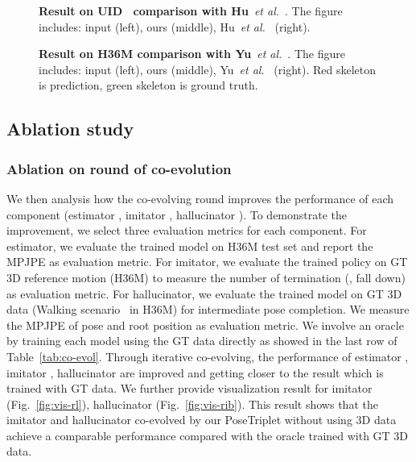 \documentclass[10pt,twocolumn,letterpaper]{article}
\newcommand{\nameofmethod}{PoseTriplet}
\newcommand{\et}{\emph{et al.}}
\begin{document}
\begin{figure}[!t]
\centering
{}
\caption{\textbf{Result on UID~\cite{hu2021unsupervised} comparison with Hu}~\et~\cite{hu2021unsupervised}. The figure includes: input (left), ours (middle), Hu~\et~\cite{hu2021unsupervised} (right).}
\vspace{-1mm}
\label{fig:compare-Hu}
\end{figure}

\begin{figure}[!t]
\centering
{}
\caption{\textbf{Result on H36M comparison with Yu}~\et~\cite{yu2021towards}. The figure includes: input (left), ours (middle), Yu~\et~\cite{yu2021towards} (right). {Red skeleton is prediction, green skeleton is ground truth.}}
\vspace{-1mm}
\label{fig:compare-yu}
\end{figure}




\subsection{Ablation study}

\subsubsection{Ablation on round of co-evolution}
We then analysis how the co-evolving round improves the performance of each component (estimator , imitator , hallucinator ).
To demonstrate the improvement, we select three evaluation metrics for each component.
For estimator, we evaluate the trained model  on H36M test set and report the MPJPE as evaluation metric.
For imitator, we evaluate the trained policy  on GT 3D reference motion (H36M) to measure the number of termination (\eg, fall down) as evaluation metric.
For hallucinator, we evaluate the trained model  on GT 3D data (Walking scenario~\cite{harvey2020robust} in H36M) for intermediate pose completion. We measure the MPJPE of pose and root position as evaluation metric.
We involve an {oracle} by training each model using the GT data directly as showed in the last row of Table~\ref{tab:co-evol}.
Through iterative co-evolving, the performance of estimator , imitator , hallucinator  are improved and getting closer to the result which is trained with GT data.
We further provide visualization result for imitator  (Fig.~\ref{fig:vis-rl}), hallucinator  (Fig.~\ref{fig:vis-rib}).
This result shows that the imitator  and hallucinator  co-evolved by our \nameofmethod{} without using 3D data achieve a comparable performance compared with the {oracle} trained with GT 3D data.
\end{document}
